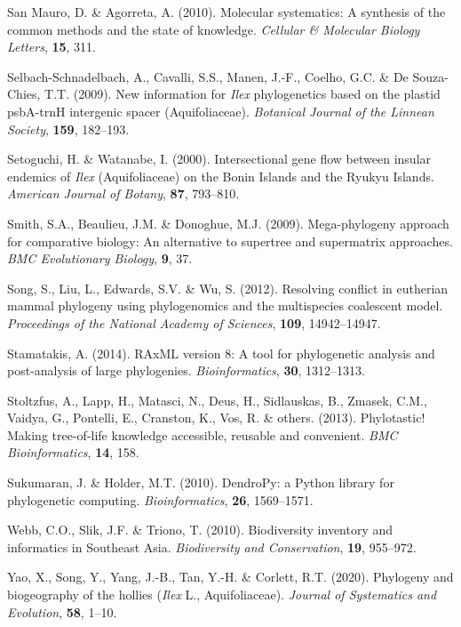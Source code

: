 \documentclass[]{article}
\begin{document}
\leavevmode\hypertarget{ref-san2010molecular}{}%
San Mauro, D. \& Agorreta, A. (2010). Molecular systematics: A synthesis of the common methods and the state of knowledge. \emph{Cellular \& Molecular Biology Letters}, \textbf{15}, 311.

\leavevmode\hypertarget{ref-selbach2009new}{}%
Selbach-Schnadelbach, A., Cavalli, S.S., Manen, J.-F., Coelho, G.C. \& De Souza-Chies, T.T. (2009). New information for \emph{Ilex} phylogenetics based on the plastid psbA-trnH intergenic spacer (Aquifoliaceae). \emph{Botanical Journal of the Linnean Society}, \textbf{159}, 182--193.

\leavevmode\hypertarget{ref-setoguchi2000intersectional}{}%
Setoguchi, H. \& Watanabe, I. (2000). Intersectional gene flow between insular endemics of \emph{Ilex} (Aquifoliaceae) on the Bonin Islands and the Ryukyu Islands. \emph{American Journal of Botany}, \textbf{87}, 793--810.

\leavevmode\hypertarget{ref-smith2009mega}{}%
Smith, S.A., Beaulieu, J.M. \& Donoghue, M.J. (2009). Mega-phylogeny approach for comparative biology: An alternative to supertree and supermatrix approaches. \emph{BMC Evolutionary Biology}, \textbf{9}, 37.

\leavevmode\hypertarget{ref-song2012resolving}{}%
Song, S., Liu, L., Edwards, S.V. \& Wu, S. (2012). Resolving conflict in eutherian mammal phylogeny using phylogenomics and the multispecies coalescent model. \emph{Proceedings of the National Academy of Sciences}, \textbf{109}, 14942--14947.

\leavevmode\hypertarget{ref-stamatakis2014raxml}{}%
Stamatakis, A. (2014). RAxML version 8: A tool for phylogenetic analysis and post-analysis of large phylogenies. \emph{Bioinformatics}, \textbf{30}, 1312--1313.

\leavevmode\hypertarget{ref-stoltzfus2013phylotastic}{}%
Stoltzfus, A., Lapp, H., Matasci, N., Deus, H., Sidlauskas, B., Zmasek, C.M., Vaidya, G., Pontelli, E., Cranston, K., Vos, R. \& others. (2013). Phylotastic! Making tree-of-life knowledge accessible, reusable and convenient. \emph{BMC Bioinformatics}, \textbf{14}, 158.

\leavevmode\hypertarget{ref-sukumaran2010dendropy}{}%
Sukumaran, J. \& Holder, M.T. (2010). DendroPy: a Python library for phylogenetic computing. \emph{Bioinformatics}, \textbf{26}, 1569--1571.

\leavevmode\hypertarget{ref-webb2010biodiversity}{}%
Webb, C.O., Slik, J.F. \& Triono, T. (2010). Biodiversity inventory and informatics in Southeast Asia. \emph{Biodiversity and Conservation}, \textbf{19}, 955--972.

\leavevmode\hypertarget{ref-yao2020phylogeny}{}%
Yao, X., Song, Y., Yang, J.-B., Tan, Y.-H. \& Corlett, R.T. (2020). Phylogeny and biogeography of the hollies (\emph{Ilex} L., Aquifoliaceae). \emph{Journal of Systematics and Evolution}, \textbf{58}, 1--10.
\end{document}
